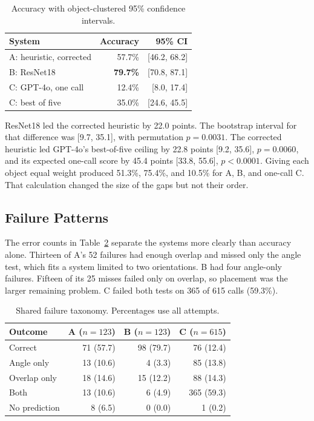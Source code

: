 \documentclass[10pt,conference,compsoc]{IEEEtran}
\begin{document}
\begin{table}[t]
\caption{Accuracy with object-clustered 95\% confidence intervals.}
\label{tab:accuracy}
\centering
\begin{tabular}{lrr}
\toprule
System & Accuracy & 95\% CI \\
\midrule
A: heuristic, corrected & 57.7\% & [46.2, 68.2] \\
B: ResNet18 & \textbf{79.7\%} & [70.8, 87.1] \\
C: GPT-4o, one call & 12.4\% & [8.0, 17.4] \\
C: best of five & 35.0\% & [24.6, 45.5] \\
\bottomrule
\end{tabular}
\end{table}

ResNet18 led the corrected heuristic by 22.0 points. The bootstrap interval
for that difference was [9.7, 35.1], with permutation $p=0.0031$. The
corrected heuristic led GPT-4o's best-of-five ceiling by 22.8 points [9.2,
35.6], $p=0.0060$, and its expected one-call score by 45.4 points [33.8,
55.6], $p<0.0001$. Giving each object equal weight produced 51.3\%, 75.4\%,
and 10.5\% for A, B, and one-call C. That calculation changed the size of the
gaps but not their order.

\subsection{Failure Patterns}

The error counts in Table~\ref{tab:taxonomy} separate the systems more clearly
than accuracy alone. Thirteen of A's 52 failures had enough overlap and missed
only the angle test, which fits a system limited to two orientations. B had
four angle-only failures. Fifteen of its 25 misses failed only on overlap, so
placement was the larger remaining problem. C failed both tests on 365 of 615
calls (59.3\%).

\begin{table}[t]
\caption{Shared failure taxonomy. Percentages use all attempts.}
\label{tab:taxonomy}
\centering
\footnotesize
\begin{tabular}{lrrr}
\toprule
Outcome & A ($n=123$) & B ($n=123$) & C ($n=615$) \\
\midrule
Correct & 71 (57.7) & 98 (79.7) & 76 (12.4) \\
Angle only & 13 (10.6) & 4 (3.3) & 85 (13.8) \\
Overlap only & 18 (14.6) & 15 (12.2) & 88 (14.3) \\
Both & 13 (10.6) & 6 (4.9) & 365 (59.3) \\
No prediction & 8 (6.5) & 0 (0.0) & 1 (0.2) \\
\bottomrule
\end{tabular}
\end{table}
\end{document}
